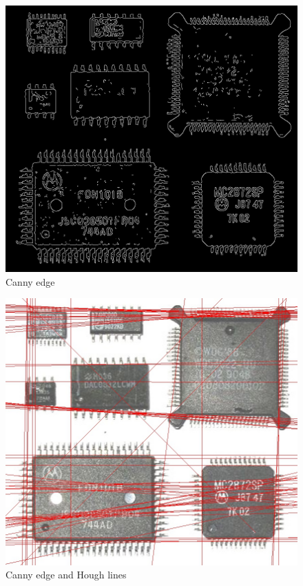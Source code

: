 \documentclass[twocolumn,oneside,a4paper]{article}
\begin{document}
\begin{figure}[htbp]
    \includegraphics[bb=0 0 854 778,width=1\columnwidth] {edges.jpg}
    \caption{Canny edge}
    \label{fig:canny}
\end{figure}

\begin{figure}[htbp]
    \includegraphics[bb=0 0 854 778,width=1\columnwidth] {edges_line.jpg}
    \caption{Canny edge and Hough lines}
    \label{fig:hough}
\end{figure}
\end{document}
